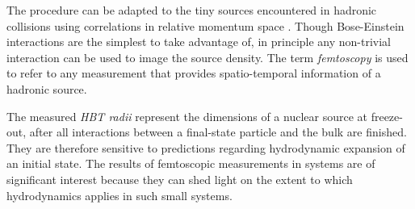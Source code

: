 The procedure can be adapted to the tiny sources encountered in hadronic collisions using correlations in relative momentum space \cite{Goldhaber:1960sf}.
Though Bose-Einstein interactions are the simplest to take advantage of, in principle any non-trivial interaction can be used to image the source density.
The term \emph{femtoscopy} is used to refer to any measurement that provides spatio-temporal information of a hadronic source.

The measured \emph{HBT radii} represent the dimensions of a nuclear source at freeze-out, after all interactions between a final-state particle and the bulk are finished.
They are therefore sensitive to predictions regarding hydrodynamic expansion of an initial state.
The results of femtoscopic measurements in \pPb systems are of significant interest because they can shed light on the extent to which hydrodynamics applies in such small systems.

